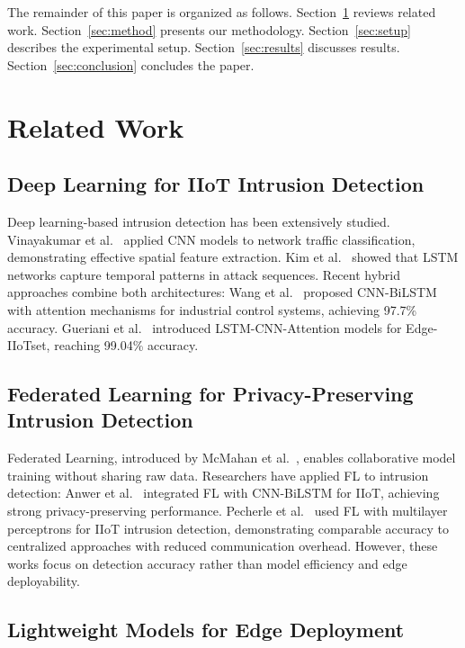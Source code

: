 \documentclass[a4paper,fleqn]{cas-sc}
\begin{document}
The remainder of this paper is organized as follows. Section~\ref{sec:related} reviews related work. Section~\ref{sec:method} presents our methodology. Section~\ref{sec:setup} describes the experimental setup. Section~\ref{sec:results} discusses results. Section~\ref{sec:conclusion} concludes the paper.

\section{Related Work}
\label{sec:related}

\subsection{Deep Learning for IIoT Intrusion Detection}

Deep learning-based intrusion detection has been extensively studied. Vinayakumar et al.~\cite{vinayakumar2017cnn} applied CNN models to network traffic classification, demonstrating effective spatial feature extraction. Kim et al.~\cite{kim2019deep} showed that LSTM networks capture temporal patterns in attack sequences. Recent hybrid approaches combine both architectures: Wang et al.~\cite{wang2024industrial} proposed CNN-BiLSTM with attention mechanisms for industrial control systems, achieving 97.7\% accuracy. Gueriani et al.~\cite{gueriani2025adaptive} introduced LSTM-CNN-Attention models for Edge-IIoTset, reaching 99.04\% accuracy.

\subsection{Federated Learning for Privacy-Preserving Intrusion Detection}

Federated Learning, introduced by McMahan et al.~\cite{mcmahan2017communication}, enables collaborative model training without sharing raw data. Researchers have applied FL to intrusion detection: Anwer et al.~\cite{anwer2025advanced} integrated FL with CNN-BiLSTM for IIoT, achieving strong privacy-preserving performance. Pecherle et al.~\cite{pecherle2026federated} used FL with multilayer perceptrons for IIoT intrusion detection, demonstrating comparable accuracy to centralized approaches with reduced communication overhead. However, these works focus on detection accuracy rather than model efficiency and edge deployability.

\subsection{Lightweight Models for Edge Deployment}
\end{document}
